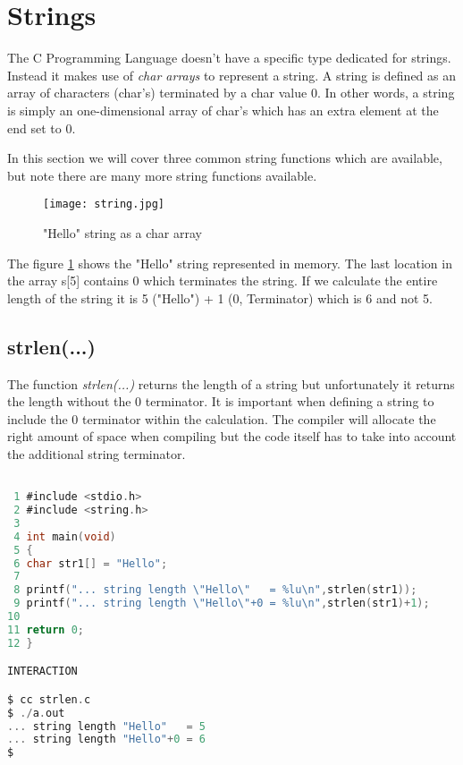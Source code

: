 \section{Strings}


The C Programming Language doesn't have a specific type dedicated for strings. Instead it makes use of \textit{char arrays} to represent a string. A string is defined as an array of characters (char's) terminated by a char value 0. In other words, a string is simply an one-dimensional array of char's which has an extra element at the end set to 0. 

In this section we will cover three common string functions which are available, but note there are many more string functions available.

\begin{figure}[H]
\centerline{\texttt{[image: string.jpg]}}
\caption{"Hello" string as a char array}
\label{HelloString}
\end{figure}

The figure \ref{HelloString} shows the "Hello" string represented in memory. The last location in the array s[5] contains 0 which terminates the string. If we calculate the entire length of the string it is 5 ("Hello") + 1 (0, Terminator) which is 6 and not 5.  

\subsection{strlen(...)}


The function \textit{strlen(...)} returns the length of a string but unfortunately it returns the length without the 0 terminator. It is important when defining a string to include the 0 terminator within the calculation. The compiler will allocate the right amount of space when compiling but the code itself has to take into account the additional string terminator.

\begin{lstlisting}[language=C,showstringspaces=false,caption={File: strlen.c},label={strcmp},captionpos=b,label=strlen]

 1 #include <stdio.h>
 2 #include <string.h>
 3    
 4 int main(void)
 5 {
 6 char str1[] = "Hello";
 7 
 8 printf("... string length \"Hello\"   = %lu\n",strlen(str1));
 9 printf("... string length \"Hello\"+0 = %lu\n",strlen(str1)+1);
10  
11 return 0;
12 }

INTERACTION

$ cc strlen.c
$ ./a.out
... string length "Hello"   = 5
... string length "Hello"+0 = 6
$

\end{lstlisting}

